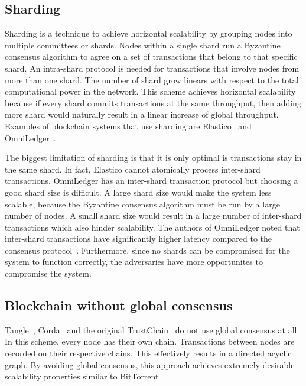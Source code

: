\subsection{Sharding}

Sharding is a technique to achieve horizontal scalability by grouping nodes into multiple committees or shards.
Nodes within a single shard run a Byzantine consensus algorithm to agree on a set of transactions that belong to that specific shard.
An intra-shard protocol is needed for transactions that involve nodes from more than one shard.
The number of shard grow linears with respect to the total computational power in the network.
This scheme achieves horizontal scalability because if every shard commits transactions at the same throughput,
then adding more shard would naturally result in a linear increase of global throughput.
Examples of blockchain systems that use sharding are Elastico~\cite{luu2016elastico} and OmniLedger~\cite{kokoris2017omniledger}.

The biggest limitation of sharding is that it is only optimal is transactions stay in the same shard.
In fact, Elastico cannot atomically process inter-shard transactions.
OmniLedger has an inter-shard transaction protocol but choosing a good shard size is difficult.
A large shard size would make the system less scalable, because the Byzantine consensus algorithm must be run by a large number of nodes.
A small shard size would result in a large number of inter-shard transactions which also hinder scalability.
The authors of OmniLedger noted that inter-shard transactions have significantly higher latency compared to the consensus protocol~\cite{kokoris2017omniledger}.
Furthermore, since no shards can be compromised for the system to function correctly,
the adversaries have more opportunites to compromise the system.

\subsection{Blockchain without global consensus}

Tangle~\cite{tangle}, Corda~\cite{corda} and the original TrustChain~\cite{multichain} do not use global consensus at all.
In this scheme, every node has their own chain.
Transactions between nodes are recorded on their respective chains.
This effectively results in a directed acyclic graph.
By avoiding global consensus, this approach achieves extremely desirable scalability properties similar to BitTorrent~\cite{cohen2003incentives}.

